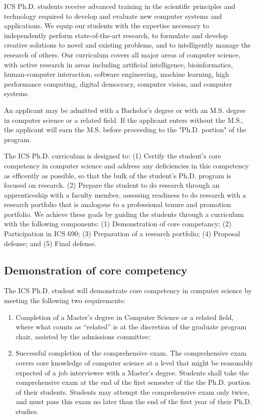 \documentclass[12pt]{article}
\begin{document}
ICS Ph.D. students receive advanced training in the scientific principles and
technology required to develop and evaluate new computer systems and
applications. We equip our students with the expertise necessary to
independently perform state-of-the-art research, to formulate and develop
creative solutions to novel and existing problems, and to intelligently
manage the research of others. Our curriculum covers all major areas of
computer science, with active research in areas including artificial
intelligence, bioinformatics, human-computer interaction, software
engineering, machine learning, high performance computing, digital
democracy, computer vision, and computer systems.

An applicant may be admitted with a Bachelor's degree or with an
M.S. degree in computer science or a related field. If the applicant enters
without the M.S., the applicant will earn the M.S. before proceeding to the
"Ph.D. portion" of the program.

The ICS Ph.D. curriculum is designed to: (1) Certify the student's core
competency in computer science and address any deficiencies in this
competency as efficently as possible, so that the bulk of the student's
Ph.D. program is focused on research. (2) Prepare the student to do
research through an apprenticeship with a faculty member, assessing
readiness to do research with a research portfolio that is analogous to a
professional tenure and promotion portfolio.  We achieve these goals by
guiding the students through a curriculum with the following components:
(1) Demonstration of core competancy; (2) Participation in ICS 690; (3)
Preparation of a research portfolio; (4) Proposal defense; and (5) Final
defense.

\subsection*{Demonstration of core competency}

The ICS Ph.D. student will demonstrate core competency in computer science
by meeting the following two requirements:

\begin{enumerate}
\item Completion of a Master's degree in Computer Science or a related
  field, where what counts as ``related'' is at the discretion of the
  graduate program chair, assisted by the admissions committee;
\item Successful completion of the comprehensive exam.  The comprehensive exam
  covers core knowledge of computer science at a level that might be
  reasonably expected of a job interviewee with a Master's degree.
  Students shall take the comprehensive exam at the end of the first semester
  of the the Ph.D. portion of their students.  Students may attempt the
  comprehensive exam only twice, and must pass this exam no later than the end
  of the first year of their Ph.D. studies.  
\end{enumerate}
\end{document}
